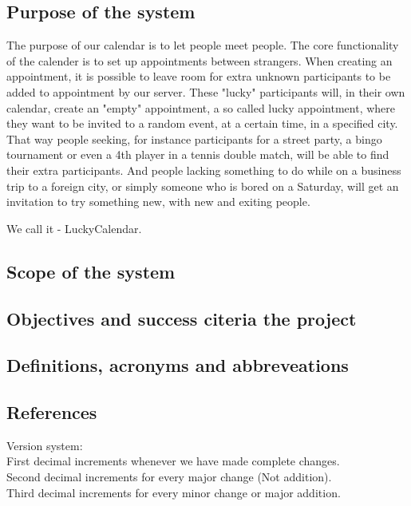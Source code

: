 \subsection{Purpose of the system}
		The purpose of our calendar is to let people meet people. The core functionality of the calender is to set up appointments between strangers. When creating an appointment, it is possible to leave room for extra unknown participants to be added to appointment by our server. These "lucky" participants will, in their own calendar, create an "empty" appointment, a so called lucky appointment, where they want to be invited to a random event, at a certain time, in a specified city. That way people seeking, for instance participants for a street party, a bingo tournament or even a 4th player in a tennis double match, will be able to find their extra participants. And people lacking something to do while on a business trip to a foreign city, or simply someone who is bored on a Saturday, will get an invitation to try something new, with new and exiting people.

		We call it - LuckyCalendar.

\subsection{Scope of the system}

\subsection{Objectives and success citeria the project}

\subsection{Definitions, acronyms and abbreveations}

\subsection{References}


Version system:\\
First decimal increments whenever we have made complete changes. \\
Second decimal increments for every major change (Not addition).   \\
Third decimal increments for every minor change or major addition.\\

